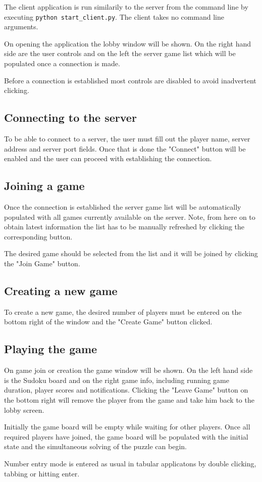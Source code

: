 \documentclass[a4paper]{article}
\begin{document}
The client application is run similarily to the server from the command line by executing \texttt{python start\_client.py}. The client takes no command line arguments.

On opening the application the lobby window will be shown. On the right hand side are the user controls and on the left the server game list which will be populated once a connection is made.

Before a connection is established most controls are disabled to avoid inadvertent clicking.


\subsection{Connecting to the server}

To be able to connect to a server, the user must fill out the player name, server address and server port fields. Once that is done the "Connect" button will be enabled and the user can proceed with establishing the connection.


\subsection{Joining a game}

Once the connection is established the server game list will be automatically populated with all games currently available on the server. Note, from here on to obtain latest information the list has to be manually refreshed by clicking the corresponding button.

The desired game should be selected from the list and it will be joined by clicking the "Join Game" button.


\subsection{Creating a new game}

To create a new game, the desired number of players must be entered on the bottom right of the window and the "Create Game" button clicked.


\subsection{Playing the game}

On game join or creation the game window will be shown. On the left hand side is the Sudoku board and on the right game info, including running game duration, player scores and notifications. Clicking the "Leave Game" button on the bottom right will remove the player from the game and take him back to the lobby screen.

Initially the game board will be empty while waiting for other players. Once all required players have joined, the game board will be populated with the initial state and the simultaneous solving of the puzzle can begin.

Number entry mode is entered as usual in tabular applicatons by double clicking, tabbing or hitting enter.
\end{document}
